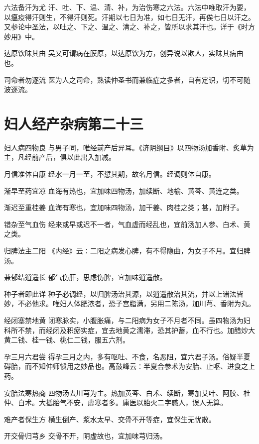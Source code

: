 \documentclass[a4paper,12pt,UTF8,twoside]{ctexbook}
\begin{document}
    六法备汗为尤
    汗、吐、下、温、清、补，为治伤寒之六法。六法中唯取汗为要，以瘟疫得汗则生，不得汗则死。汗期以七日为准，如七日无汗，再俟七日以汗之。又参论中圣法，以吐之、下之、温之、清之、补之，皆所以求其汗也。详于《时方妙用》中。
    
    达原饮昧其由
    吴又可谓病在膜原，以达原饮为方，创异说以欺人，实昧其病由也。
    
    司命者勿逐流
    医为人之司命，熟读仲圣书而兼临症之多者，自有定识，切不可随波逐流。
    \chapter{妇人经产杂病第二十三}
    妇人病四物良
    与男子同，唯经前产后异耳。《济阴纲目》以四物汤加香附、炙草为主，凡经前产后，俱以此出入加减。
    
    月信准体自康
    经水一月一至，不愆其期，故名月信。经调则体自康。
    
    渐早至药宜凉
    血海有热也，宜加味四物汤，加续断、地榆、黄芩、黄连之类。
    
    渐迟至重桂姜
    血海有寒也，宜加味四物汤，加干姜、肉桂之类；甚，加附子。
    
    错杂至气血伤
    经来或早或迟不一者，气血虚而经乱也，宜前汤加人参、白术、黄之类。
    
    归脾法主二阳
    《内经》云∶二阳之病发心脾，有不得隐曲，为女子不月。宜归脾汤。
    
    兼郁结逍遥长
    郁气伤肝，思虑伤脾，宜加味逍遥散。
    
    种子者即此详
    种子必调经，以归脾汤治其源，以逍遥散治其流，并以上诸法皆妙，不必他求。唯妇人体肥浓者，恐子宫脂满，另用二陈汤，加川芎、香附为丸。
    
    经闭塞禁地黄
    闭寒脉实，小腹胀痛，与二阳病为女子不月者不同。虽四物汤为妇科所不禁，而经闭及积瘀实症，宜去地黄之濡滞，恐其护蓄，血不行也。加醋炒大黄二钱、桂一钱、桃仁二钱，服五六剂。
    
    孕三月六君尝
    得孕三月之内，多有呕吐、不食，名恶阻，宜六君子汤。俗疑半夏碍胎，而不知仲师惯用之妙品也。高鼓峰云∶半夏合参术为安胎、止呕、进食之上药。
    
    安胎法寒热商
    四物汤去川芎为主。热加黄芩、白术、续断，寒加艾叶、阿胶、杜仲、白术。大抵胎气不安，虚寒者多。庸医以胎火二字惑人，误人无算。
    
    难产者保生方
    横生倒产、浆水太早、交骨不开等症，宜保生无忧散。
    
    开交骨归芎乡
    交骨不开，阴虚故也，宜加味芎归汤。
    
\end{document}
